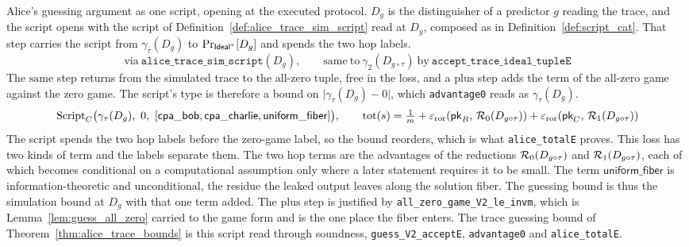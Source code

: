 \begin{definition}
  \label{def:alice_trace_script}
  \rocqok
  Alice's guessing argument as one script, opening at the executed protocol.
  $D_g$ is the distinguisher of a predictor $g$ reading the trace, and the
  script opens with the script of Definition~\ref{def:alice_trace_sim_script}
  read at $D_g$, composed as in Definition~\ref{def:script_cat}. That step
  carries the script from $\gamma_\tau(D_g)$ to $\Pr_{\mathsf{Ideal}^\tau}[D_g]$ and
  spends the two hop labels.
  \[ \mathrm{via}\ \texttt{alice\_trace\_sim\_script}(D_g),
     \qquad
     \mathrm{same\ to}\ \gamma_2(D_{g \circ \tau})\ \mathrm{by}\
       \texttt{accept\_trace\_ideal\_tupleE} \]
  The $\mathrm{same}$ step returns from the simulated trace to the all-zero
  tuple, free in the loss, and a $\mathrm{plus}$ step adds the term of the
  all-zero game against the zero game. The script's type
  is therefore a bound on $\lvert \gamma_\tau(D_g) - 0 \rvert$, which
  \texttt{advantage0} reads as $\gamma_\tau(D_g)$.
  \[ \mathrm{Script}_C\big(\gamma_\tau(D_g),\ 0,\
       [\mathsf{cpa\_bob}, \mathsf{cpa\_charlie},
        \mathsf{uniform\_fiber}]\big),
     \qquad
     \mathrm{tot}(s) = \tfrac{1}{m} + \epshopsum{D_{g \circ \tau}} \]
  The script spends the two hop labels before the zero-game label, so the bound
  reorders, which is what \texttt{alice\_totalE} proves.
  This loss has two kinds of term and the labels separate them. The two hop
  terms are the advantages of the reductions $\mathcal{R}_{0}(D_{g \circ \tau})$ and
  $\mathcal{R}_{1}(D_{g \circ \tau})$, each of which becomes conditional on a
  computational assumption only where a later statement requires it to be
  small. The term $\mathsf{uniform\_fiber}$ is information-theoretic and
  unconditional, the residue the leaked output leaves along the solution fiber.
  The guessing bound is thus the simulation bound at $D_g$ with that one term
  added. The $\mathrm{plus}$ step is justified by
  \texttt{all\_zero\_game\_V2\_le\_invm}, which is
  Lemma~\ref{lem:guess_all_zero} carried to the game form and is the one place
  the fiber enters. The trace guessing bound of
  Theorem~\ref{thm:alice_trace_bounds} is this script read through soundness,
  \texttt{guess\_V2\_acceptE}, \texttt{advantage0} and
  \texttt{alice\_totalE}.
\end{definition}


